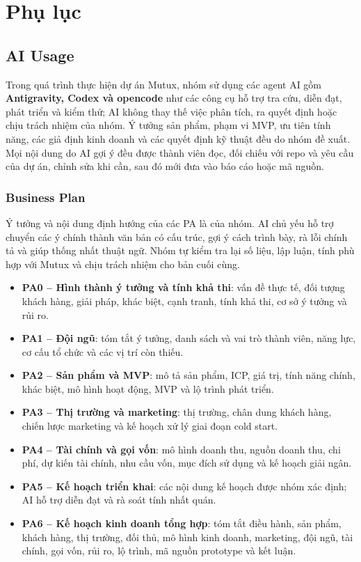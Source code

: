 \section{Phụ lục}

\subsection{AI Usage}

Trong quá trình thực hiện dự án Mutux, nhóm sử dụng các agent AI gồm
\textbf{Antigravity, Codex và opencode} như các công cụ hỗ trợ tra cứu, diễn
đạt, phát triển và kiểm thử; AI không thay thế việc phân tích, ra quyết định
hoặc chịu trách nhiệm của nhóm. Ý tưởng sản phẩm, phạm vi MVP,
ưu tiên tính năng, các giả định kinh doanh và các quyết định kỹ thuật đều do
nhóm đề xuất. Mọi nội dung do AI gợi ý đều được thành viên đọc, đối chiếu với
repo và yêu cầu của dự án, chỉnh sửa khi cần, sau đó mới đưa vào báo cáo hoặc
mã nguồn.

\subsubsection{Business Plan}

Ý tưởng và nội dung định hướng của các PA là của nhóm. AI chủ yếu hỗ trợ
chuyển các ý chính thành văn bản có cấu trúc, gợi ý cách trình bày, rà lỗi
chính tả và giúp thống nhất thuật ngữ. Nhóm tự kiểm tra lại số liệu, lập luận,
tính phù hợp với Mutux và chịu trách nhiệm cho bản cuối cùng.
\begin{itemize}
    \item \textbf{PA0 -- Hình thành ý tưởng và tính khả thi}: vấn đề thực tế,
    đối tượng khách hàng, giải pháp, khác biệt, cạnh tranh, tính khả thi,
    cơ sở ý tưởng và rủi ro.
    \item \textbf{PA1 -- Đội ngũ}: tóm tắt ý tưởng, danh sách và vai trò thành
    viên, năng lực, cơ cấu tổ chức và các vị trí còn thiếu.
    \item \textbf{PA2 -- Sản phẩm và MVP}: mô tả sản phẩm, ICP, giá trị,
    tính năng chính, khác biệt, mô hình hoạt động, MVP và lộ trình phát triển.
    \item \textbf{PA3 -- Thị trường và marketing}: thị trường, chân dung
    khách hàng, chiến lược marketing và kế hoạch xử lý giai đoạn cold start.
    \item \textbf{PA4 -- Tài chính và gọi vốn}: mô hình doanh thu, nguồn doanh
    thu, chi phí, dự kiến tài chính, nhu cầu vốn, mục đích sử dụng và kế hoạch
    giải ngân.
    \item \textbf{PA5 -- Kế hoạch triển khai}: các nội dung kế hoạch được
    nhóm xác định; AI hỗ trợ diễn đạt và rà soát tính nhất quán.
    \item \textbf{PA6 -- Kế hoạch kinh doanh tổng hợp}: tóm tắt điều hành,
    sản phẩm, khách hàng, thị trường, đối thủ, mô hình kinh doanh, marketing,
    đội ngũ, tài chính, gọi vốn, rủi ro, lộ trình, mã nguồn prototype và kết
    luận.
\end{itemize}

